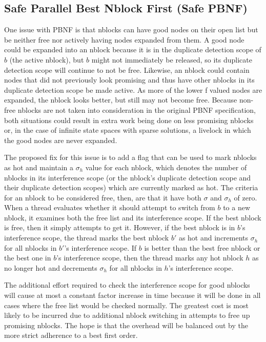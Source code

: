\documentclass{article}
\begin{document}
\subsection{Safe Parallel Best Nblock First (Safe PBNF)}
One issue with PBNF is that nblocks can have good nodes on their open list but be neither free nor actively having nodes expanded from them. A good node could be expanded into an nblock because it is in the duplicate detection scope of $b$ (the active nblock), but $b$ might not immediately be released, so its duplicate detection scope will continue to not be free. Likewise, an nblock could contain nodes that did not previously look promising and thus have other nblocks in its duplicate detection scope be made active. As more of the lower f valued nodes are expanded, the nblock looks better, but still may not become free. Because non-free nblocks are not taken into consideration in the original PBNF specification, both situations could result in extra work being done on less promising nblocks or, in the case of infinite state spaces with sparse solutions, a livelock in which the good nodes are never expanded.

The proposed fix for this issue is to add a flag that can be used to mark nblocks as hot and maintain a $\sigma_h$ value for each nblock, which denotes the number of nblocks in its interference scope (or the nblock's duplicate detection scope and their duplicate detection scopes) which are currently marked as hot. The criteria for an nblock to be considered free, then, are that it have both $\sigma$ and $\sigma_h$ of zero. When a thread evaluates whether it should attempt to switch from $b$ to a new nblock, it examines both the free list and its interference scope. If the best nblock is free, then it simply attempts to get it. However, if the best nblock is in $b$'s interference scope, the thread marks the best nblock $b'$ as hot and increments $\sigma_h$ for all nblocks in $b'$'s interference scope. If $b$ is better than the best free nblock or the best one in $b$'s interference scope, then the thread marks any hot nblock $h$ as no longer hot and decrements $\sigma_h$ for all nblocks in $h$'s interference scope.

The additional effort required to check the interference scope for good nblocks will cause at most a constant factor increase in time because it will be done in all cases where the free list would be checked normally. The greatest cost is most likely to be incurred due to additional nblock switching in attempts to free up promising nblocks. The hope is that the overhead will be balanced out by the more strict adherence to a best first order.
\end{document}

